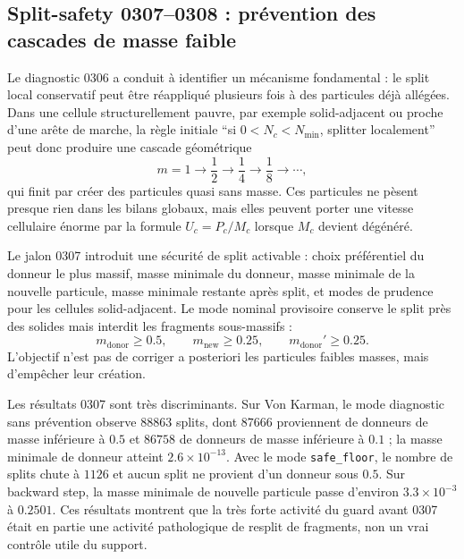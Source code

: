 \documentclass[11pt,a4paper]{article}
\begin{document}
\subsection{Split-safety 0307--0308 : prévention des cascades de masse faible}

Le diagnostic 0306 a conduit à identifier un mécanisme fondamental : le split local conservatif peut être réappliqué plusieurs fois à des particules déjà allégées. Dans une cellule structurellement pauvre, par exemple solid-adjacent ou proche d'une arête de marche, la règle initiale ``si $0<N_c<N_{\min}$, splitter localement'' peut donc produire une cascade géométrique
\begin{equation}
  m=1 \to \frac12 \to \frac14 \to \frac18 \to \cdots,
\end{equation}
qui finit par créer des particules quasi sans masse. Ces particules ne pèsent presque rien dans les bilans globaux, mais elles peuvent porter une vitesse cellulaire énorme par la formule $U_c=P_c/M_c$ lorsque $M_c$ devient dégénéré.

Le jalon 0307 introduit une sécurité de split activable : choix préférentiel du donneur le plus massif, masse minimale du donneur, masse minimale de la nouvelle particule, masse minimale restante après split, et modes de prudence pour les cellules solid-adjacent. Le mode nominal provisoire conserve le split près des solides mais interdit les fragments sous-massifs :
\begin{equation}
  m_{\mathrm{donor}} \geq 0.5, \qquad
  m_{\mathrm{new}} \geq 0.25, \qquad
  m_{\mathrm{donor}}' \geq 0.25.
\end{equation}
L'objectif n'est pas de corriger a posteriori les particules faibles masses, mais d'empêcher leur création.

Les résultats 0307 sont très discriminants. Sur Von Karman, le mode diagnostic sans prévention observe $88863$ splits, dont $87666$ proviennent de donneurs de masse inférieure à $0.5$ et $86758$ de donneurs de masse inférieure à $0.1$ ; la masse minimale de donneur atteint $2.6\times10^{-13}$. Avec le mode \texttt{safe\_floor}, le nombre de splits chute à $1126$ et aucun split ne provient d'un donneur sous $0.5$. Sur backward step, la masse minimale de nouvelle particule passe d'environ $3.3\times10^{-3}$ à $0.2501$. Ces résultats montrent que la très forte activité du guard avant 0307 était en partie une activité pathologique de resplit de fragments, non un vrai contrôle utile du support.
\end{document}

